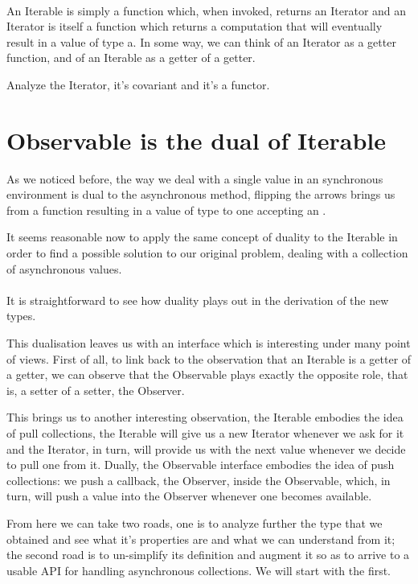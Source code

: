 \\

An Iterable is simply a function which, when invoked, returns an Iterator and an Iterator is itself a function which returns a computation that will eventually result in a value of type a. In some way, we can think of an Iterator as a getter function, and of an Iterable as a getter of a getter.

Analyze the Iterator, it's covariant and it's a functor.

\section{Observable is the dual of Iterable}

As we noticed before, the way we deal with a single value in an synchronous environment is dual to the asynchronous method, flipping the arrows brings us from a function resulting in a value of type  to one accepting an . 

It seems reasonable now to apply the same concept of duality to the Iterable in order to find a possible solution to our original problem, dealing with a collection of asynchronous values.\\

\\

It is straightforward to see how duality plays out in the derivation of the new types.

This dualisation leaves us with an interface which is interesting under many point of views. First of all, to link back to the observation that an Iterable is a getter of a getter, we can observe that the Observable plays exactly the opposite role, that is, a setter of a setter, the Observer. 

This brings us to another interesting observation, the Iterable embodies the idea of pull collections, the Iterable will give us a new Iterator whenever we ask for it and the Iterator, in turn, will provide us with the next value whenever we decide to pull one from it. Dually, the Observable interface embodies the idea of push collections: we push a callback, the Observer, inside the Observable, which, in turn, will push a value into the Observer whenever one becomes available. 

From here we can take two roads, one is to analyze further the type that we obtained and see what it's properties are and what we can understand from it; the second road is to un-simplify its definition and augment it so as to arrive to a usable API for handling asynchronous collections. We will start with the first.

